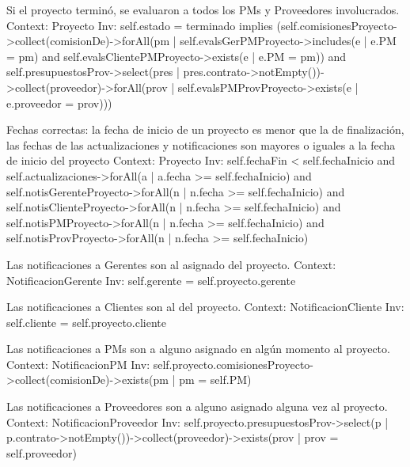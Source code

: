 \begin{listocl}
\begin{itemocl}{Si el proyecto terminó, se evaluaron a todos los PMs y Proveedores involucrados.}
Context: Proyecto
Inv: self.estado = terminado implies (self.comisionesProyecto->collect(comisionDe)->forAll(pm | self.evalsGerPMProyecto->includes(e | e.PM = pm) and self.evalsClientePMProyecto->exists(e | e.PM = pm)) and self.presupuestosProv->select(pres | pres.contrato->notEmpty())->collect(proveedor)->forAll(prov | self.evalsPMProvProyecto->exists(e | e.proveedor = prov)))
\end{itemocl}


\begin{itemocl}{Fechas correctas: la fecha de inicio de un proyecto es menor que la de finalización, las fechas de las actualizaciones y notificaciones son mayores o iguales a la fecha de inicio del proyecto}
Context: Proyecto
Inv: self.fechaFin < self.fechaInicio and self.actualizaciones->forAll(a | a.fecha >= self.fechaInicio) and self.notisGerenteProyecto->forAll(n | n.fecha >= self.fechaInicio) and self.notisClienteProyecto->forAll(n | n.fecha >= self.fechaInicio) and self.notisPMProyecto->forAll(n | n.fecha >= self.fechaInicio) and self.notisProvProyecto->forAll(n | n.fecha >= self.fechaInicio)
\end{itemocl}


\begin{itemocl}{Las notificaciones a Gerentes son al asignado del proyecto.}
Context: NotificacionGerente
Inv: self.gerente = self.proyecto.gerente
\end{itemocl}

\begin{itemocl}{Las notificaciones a Clientes son al del proyecto.}
Context: NotificacionCliente
Inv: self.cliente = self.proyecto.cliente
\end{itemocl}

\begin{itemocl}{Las notificaciones a PMs son a alguno asignado en algún momento al proyecto.}
Context: NotificacionPM
Inv: self.proyecto.comisionesProyecto->collect(comisionDe)->exists(pm | pm = self.PM)
\end{itemocl}

\begin{itemocl}{Las notificaciones a Proveedores son a alguno asignado alguna vez al proyecto.}
Context: NotificacionProveedor
Inv: self.proyecto.presupuestosProv->select(p | p.contrato->notEmpty())->collect(proveedor)->exists(prov | prov = self.proveedor)
\end{itemocl}

\end{listocl}